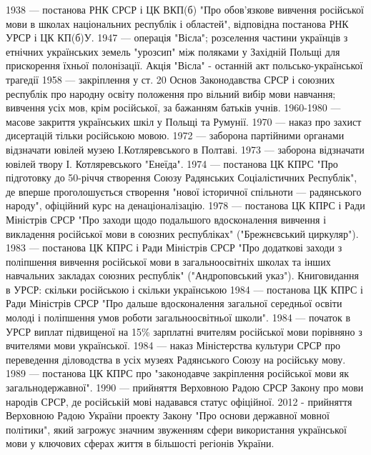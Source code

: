 1938 — постанова РНК СРСР і ЦК ВКП(б) "Про обов'язкове вивчення російської мови в школах національних республік і областей", відповідна постанова РНК УРСР і ЦК КП(б)У.
1947 — операція "Вісла"; розселення частини українців з етнічних українських земель "урозсип" між поляками у Західній Польщі для прискорення їхньої полонізації.
Акція "Вісла" - останній акт польсько-української трагедії
1958 — закріплення у ст. 20 Основ Законодавства СРСР і союзних республік про народну освіту положення про вільний вибір мови навчання; вивчення усіх мов, крім російської, за бажанням батьків учнів.
1960-1980 — масове закриття українських шкіл у Польщі та Румунії.
1970 — наказ про захист дисертацій тільки російською мовою.
1972 — заборона партійними органами відзначати ювілей музею І.Котляревського в Полтаві.
1973 — заборона відзначати ювілей твору І. Котляревського "Енеїда".
1974 — постанова ЦК КПРС "Про підготовку до 50-річчя створення Союзу Радянських Соціалістичних Республік", де вперше проголошується створення "нової історичної спільноти — радянського народу", офіційний курс на денаціоналізацію.
1978 — постанова ЦК КПРС і Ради Міністрів СРСР "Про заходи щодо подальшого вдосконалення вивчення і викладення російської мови в союзних республіках" ("Брежнєвський циркуляр").
1983 — постанова ЦК КПРС і Ради Міністрів СРСР "Про додаткові заходи з поліпшення вивчення російської мови в загальноосвітніх школах та інших навчальних закладах союзних республік" ("Андроповський указ").
Книговидання в УРСР: скільки російською і скільки українською
1984 — постанова ЦК КПРС і Ради Міністрів СРСР "Про дальше вдосконалення загальної середньої освіти молоді і поліпшення умов роботи загальноосвітньої школи".
1984 — початок в УРСР виплат підвищеної на 15\% зарплатні вчителям російської мови порівняно з вчителями мови української.
1984 — наказ Міністерства культури СРСР про переведення діловодства в усіх музеях Радянського Союзу на російську мову.
1989 — постанова ЦК КПРС про "законодавче закріплення російської мови як загальнодержавної".
1990 — прийняття Верховною Радою СРСР Закону про мови народів СРСР, де російській мові надавався статус офіційної.
2012 - прийняття Верховною Радою України проекту Закону "Про основи державної мовної політики", який загрожує значним звуженням сфери використання української мови у ключових сферах життя в більшості регіонів України.
